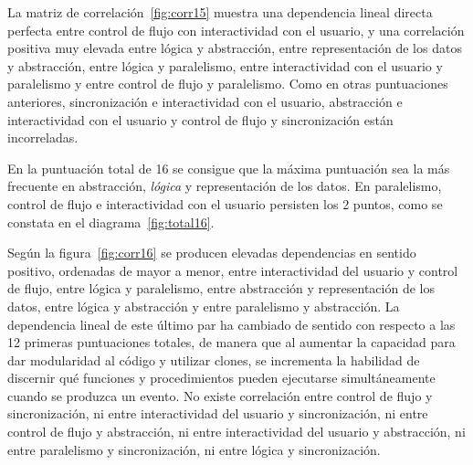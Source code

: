 \documentclass[a4paper, 12pt]{book}
\begin{document}
La matriz de correlación~\ref{fig:corr15} muestra una dependencia lineal directa perfecta entre control de flujo con interactividad con el usuario, y una correlación positiva muy elevada entre lógica y abstracción, entre representación de los datos y abstracción, entre lógica y paralelismo, entre interactividad con el usuario y paralelismo y entre control de flujo y paralelismo. Como en otras puntuaciones anteriores, sincronización e interactividad con el usuario, abstracción e interactividad con el usuario y control de flujo y sincronización están incorreladas.%

En la puntuación total de 16 se consigue que la máxima puntuación sea la más frecuente en abstracción, \emph{lógica} y representación de los datos. En paralelismo, control de flujo e interactividad con el usuario persisten los 2 puntos, como se constata en el diagrama~\ref{fig:total16}.

Según la figura~\ref{fig:corr16} se producen elevadas dependencias en sentido positivo, ordenadas de mayor a menor, entre interactividad del usuario y control de flujo, entre lógica y paralelismo, entre abstracción y representación de los datos, entre lógica y abstracción y entre paralelismo y abstracción. La dependencia lineal de este último par ha cambiado de sentido con respecto a las 12 primeras puntuaciones totales, de manera que al aumentar la capacidad para dar modularidad al código y utilizar clones, se incrementa la habilidad de discernir qué funciones y procedimientos pueden ejecutarse simultáneamente cuando se produzca un evento. No existe correlación entre control de flujo y sincronización, ni entre interactividad del usuario y sincronización, ni entre control de flujo y abstracción, ni entre interactividad del usuario y abstracción, ni entre paralelismo y sincronización, ni entre lógica y sincronización. 
\end{document}
